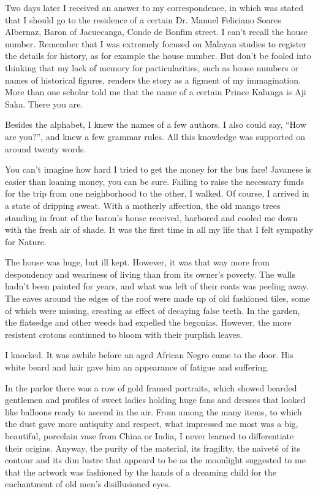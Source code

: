\documentclass[a4paper,12pt]{book}
\begin{document}
Two days later I received an answer to my correspondence,
in which was stated
that I should go to the residence of
a certain Dr. Manuel Feliciano Soares Albernaz,
Baron of Jacuecanga,
Conde de Bonfim street.
I can't recall the house
number. Remember that  I was extremely focused
on Malayan studies to register the details
for history, as for example the house number.
But don't be fooled into thinking that
my lack of memory for particularities,
such as house numbers or names of historical
figures, renders the story as a figment
of my immagination. More than one scholar
told me that the  name of a certain
Prince Kalunga 
is Aji Saka. 
There you are.

Besides the alphabet, I knew the names
of a few authors. I also could say, ``How are
you?'', and knew a few grammar rules.
All this knowledge was supported
on around twenty words.

You can't imagine how hard I tried
to get the money for the bus fare! Javanese
is easier than loaning money,
you can be sure. Failing to raise
the necessary funds for the trip from
one neighborhood to the other, I walked.
Of course, I arrived in a state of dripping sweat.
With a motherly
affection, the old
mango trees standing in front
of the baron's house received, harbored
and cooled me down with the fresh air of shade.
It was the first time in all my life
that I felt sympathy for Nature.

The house was huge, but ill kept.
However, it was that way more from
despondency and weariness of living
than from its owner's poverty.
The walls hadn't been
painted for years, and what was left
of their coats was peeling away.
The eaves around the edges of the
roof were made up of old fashioned tiles,
some of which were missing, creating
as effect of decaying false teeth.
In the garden, the
flatsedge and other weeds had expelled the 
begonias. However, the more resistent crotons
continued to bloom with their purplish leaves.

I knocked. It was awhile before 
an aged African Negro came to the door. His white
beard and hair gave him an appearance of
fatigue and suffering.

In the parlor there was a row of gold framed portraits,
which showed bearded gentlemen and profiles of
sweet ladies holding huge fans and dresses
that looked like balloons ready to ascend in the air.
From among the many items,
to which the dust gave more antiquity and respect,
what impressed me most was a big, beautiful,
porcelain vase from China or India, I never
learned to differentiate their origins.
Anyway, the purity of the material,
its fragility, the naiveté of its contour
and its dim lustre that appeard to be
as the moonlight suggested to me that
the artwork was fashioned by the hands
of a dreaming child for
the enchantment of old men's  disillusioned eyes.
\end{document}
